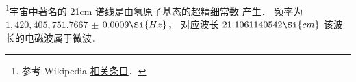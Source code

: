 
\begin{issues}
\issueDraft
\issueMissDepend
\end{issues}

\footnote{参考 Wikipedia \href{https://en.wikipedia.org/wiki/Hydrogen_line}{相关条目}．}宇宙中著名的 21cm 谱线是由氢原子基态的超精细常数%
产生． 频率为 $1,420,405,751.7667$ $\pm$ $0.0009 \Si{Hz}$， 对应波长 $21.1061140542\Si{cm}$ 该波长的电磁波属于微波．
